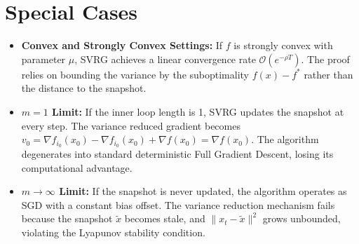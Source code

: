 \documentclass[11pt]{article}
\begin{document}
\section*{Special Cases}
\begin{itemize}
    \item \textbf{Convex and Strongly Convex Settings:} If $f$ is strongly convex with parameter $\mu$, SVRG achieves a linear convergence rate $\mathcal{O}(e^{-\rho T})$. The proof relies on bounding the variance by the suboptimality $f(x) - f^*$ rather than the distance to the snapshot.
    \item \textbf{$m=1$ Limit:} If the inner loop length is 1, SVRG updates the snapshot at every step. The variance reduced gradient becomes $v_0 = \nabla f_{i_0}(x_0) - \nabla f_{i_0}(x_0) + \nabla f(x_0) = \nabla f(x_0)$. The algorithm degenerates into standard deterministic Full Gradient Descent, losing its computational advantage.
    \item \textbf{$m \to \infty$ Limit:} If the snapshot is never updated, the algorithm operates as SGD with a constant bias offset. The variance reduction mechanism fails because the snapshot $\tilde{x}$ becomes stale, and $\|x_t - \tilde{x}\|^2$ grows unbounded, violating the Lyapunov stability condition.
\end{itemize}
\end{document}
